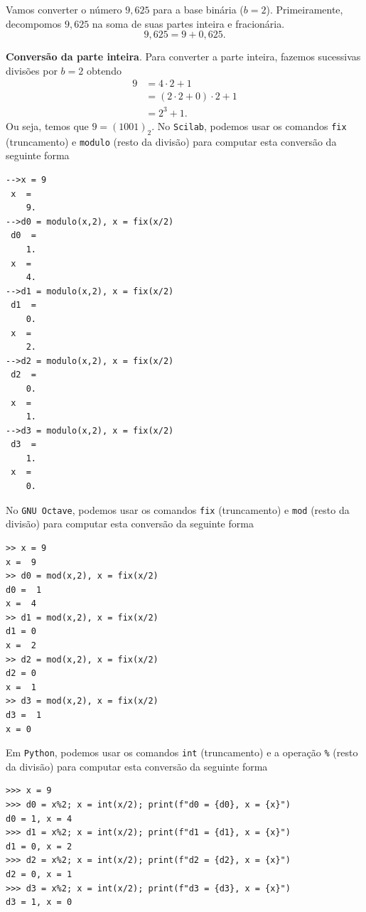 \begin{ex}
  Vamos converter o número $9,625$ para a base binária ($b=2$). Primeiramente, decompomos $9,625$ na soma de suas partes inteira e fracionária.
  \begin{equation}
    9,625 = 9 + 0,625.
  \end{equation}

{\bf Conversão da parte inteira}. Para converter a parte inteira, fazemos sucessivas divisões por $b=2$ obtendo
\begin{align}
  9 &= 4\cdot 2 + 1\\
  &= (2\cdot 2 + 0)\cdot 2 + 1\\
  &= 2^3 + 1.
\end{align}
Ou seja, temos que $9 = (1001)_2$.
\ifisscilab
No \verb+Scilab+, podemos usar os comandos \verb+fix+ (truncamento) e \verb+modulo+ (resto da divisão) para computar esta conversão da seguinte forma
\begin{verbatim}
-->x = 9
 x  =
    9.
-->d0 = modulo(x,2), x = fix(x/2)
 d0  =
    1.
 x  =
    4.
-->d1 = modulo(x,2), x = fix(x/2)
 d1  =
    0.
 x  =
    2.
-->d2 = modulo(x,2), x = fix(x/2)
 d2  =
    0.
 x  =
    1.
-->d3 = modulo(x,2), x = fix(x/2)
 d3  =
    1.
 x  =
    0.
\end{verbatim}
\fi
\ifisoctave
No \verb+GNU Octave+, podemos usar os comandos \verb+fix+ (truncamento) e \verb+mod+ (resto da divisão) para computar esta conversão da seguinte forma
\begin{verbatim}
>> x = 9
x =  9
>> d0 = mod(x,2), x = fix(x/2)
d0 =  1
x =  4
>> d1 = mod(x,2), x = fix(x/2)
d1 = 0
x =  2
>> d2 = mod(x,2), x = fix(x/2)
d2 = 0
x =  1
>> d3 = mod(x,2), x = fix(x/2)
d3 =  1
x = 0
\end{verbatim}
\fi
\ifispython
Em \verb+Python+, podemos usar os comandos \verb+int+ (truncamento) e a operação \verb+%+ (resto da divisão) para computar esta conversão da seguinte forma
\begin{verbatim}
>>> x = 9
>>> d0 = x%2; x = int(x/2); print(f"d0 = {d0}, x = {x}")
d0 = 1, x = 4
>>> d1 = x%2; x = int(x/2); print(f"d1 = {d1}, x = {x}")
d1 = 0, x = 2
>>> d2 = x%2; x = int(x/2); print(f"d2 = {d2}, x = {x}")
d2 = 0, x = 1
>>> d3 = x%2; x = int(x/2); print(f"d3 = {d3}, x = {x}")
d3 = 1, x = 0
\end{verbatim}
\fi


\end{ex}
